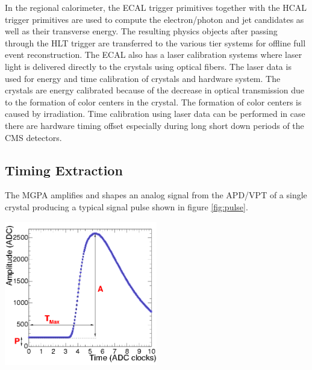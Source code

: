 In the regional calorimeter, the ECAL trigger primitives together with the HCAL trigger primitives are used to  compute the electron/photon and jet candidates as well as their transverse energy. The resulting physics objects after passing through the HLT trigger are transferred to the various tier systems for offline full event reconstruction. The ECAL also has a laser calibration systems where laser light is delivered directly to the \pb crystals using optical fibers. The laser data is used for energy and time calibration of crystals and hardware system. The crystals are energy calibrated because of the decrease in optical transmission due to the formation of color centers in the crystal. The formation of color centers is caused by irradiation. Time calibration using laser data can be performed in case there are hardware timing offset especially during long short down periods of the CMS detectors.
\subsection{Timing Extraction}
The MGPA amplifies and shapes an analog signal from the APD/VPT of a single crystal producing a typical signal pulse shown in figure \ref{fig:pulse}. 

\begin{center}
\centering
\mbox{\includegraphics[height=0.5\textwidth, width=0.5\textwidth]{THESISPLOTS/Time_Amplitude_Profile.png}}
\label{fig:pulse}
\end{center}

